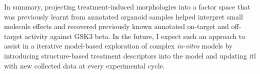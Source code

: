 \begin{flushleft}
In summary, projecting treatment-induced morphologies into a factor space that was previously learnt from annotated organoid samples helped interpret small molecule effects and recovered previously known annotated on-target and off-target activity against GSK3 beta. In the future, I expect such an approach to assist in a iterative model-based exploration of complex \textit{in-vitro} models by introducing structure-based treatment descriptors into the model and updating itl with new collected data at every experimental cycle.
\bigbreak

\end{flushleft}